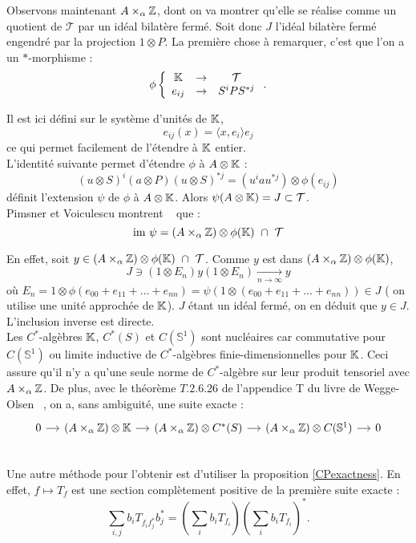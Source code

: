 Observons maintenant $A\times_\alpha \mathbb Z$, dont on va montrer qu'elle se réalise comme un quotient de $\mathcal T$ par un idéal bilatère fermé. Soit donc $J$ l'idéal bilatère fermé engendré par la projection $1\otimes P$. La première chose à remarquer, c'est que l'on a un $*$-morphisme :
\[\phi \left\{\begin{array}{ccc}\mathbb K & \rightarrow & \mathcal T\\
				e_{ij} & \rightarrow & S^i P S^{*j}\end{array}\right. .\]

Il est ici défini sur le système d'unités de $\mathbb K$, 
\[e_{ij}(x)=\langle x,e_i\rangle e_j\]
ce qui permet facilement de l'étendre à $\mathbb K$ entier. \\

L'identité suivante permet d'étendre $\phi$ à $A\otimes \mathbb K$ :
\[(u\otimes S)^i (a\otimes P) (u\otimes S)^{*j}=(u^i a u^{*j}) \otimes \phi (e_{ij})\]
définit l'extension $\psi$ de $\phi$ à $A\otimes \mathbb K$. Alors $\psi(A\otimes \mathbb K)=J\subset \mathcal T$.\\

Pimsner et Voiculescu montrent ~\cite{PV} que :
\begin{equation}
\text{im} \ \psi = (A\times _ \alpha \Z )\otimes \phi(\K) \ \cap \ \mathcal T
\label{image}
\end{equation}

En effet, soit $y\in (A\times _ \alpha \mathbb Z )\otimes \phi(\mathbb K) \ \cap \ \mathcal T$. Comme $y$ est dans $(A\times _ \alpha \mathbb Z )\otimes \phi(\mathbb K) $,
\[J \ni (1\otimes E_n) y (1\otimes E_n) \underset{n \rightarrow \infty}{\longrightarrow} y \]
où $E_n = 1\otimes\phi(e_{00}+e_{11}+...+e_{nn})=\psi (1\otimes(e_{00}+e_{11}+...+e_{nn}) )\in J$ ( on utilise une unité approchée de $\mathbb K$). $J$ étant un idéal fermé, on en déduit que $y\in J$. L'inclusion inverse est directe.\\

Les $C^*$-algèbres $\mathbb K$, $C^*(S)$ et $C(\mathbb S^1)$ sont nucléaires car commutative pour $C(\mathbb S^1)$ ou limite inductive de $C^*$-algèbres finie-dimensionnelles pour $\mathbb K$. %
Ceci assure qu'il n'y a qu'une seule norme de  $C^*$-algèbre sur leur produit tensoriel avec $A\times _\alpha \mathbb Z$. De plus, avec le théorème $T.2.6.26$ de l'appendice T du livre de Wegge-Olsen ~\cite{WeggeOlsen}, on a, sans ambiguité, une suite exacte :
\[\begin{tikzcd}[column sep=small]
0 \arrow{r} & (A\times _\alpha \Z)\otimes \K \arrow{r} &  (A\times _\alpha \Z)\otimes C^*(S) \arrow{r}  &  (A\times _\alpha \Z) \otimes C(\mathbb S^1) \arrow{r} & 0 \\ 
\end{tikzcd}\] 
Une autre méthode pour l'obtenir est d'utiliser la proposition \ref{CPexactness}. En effet, $f\mapsto T_f$ est une section complètement positive de la première suite exacte :
\[\sum_{i,j} b_i T_{f_i f_j^*} b_j^*= (\sum_i b_i T_{f_i})(\sum_i b_i T_{f_i})^*.\]


